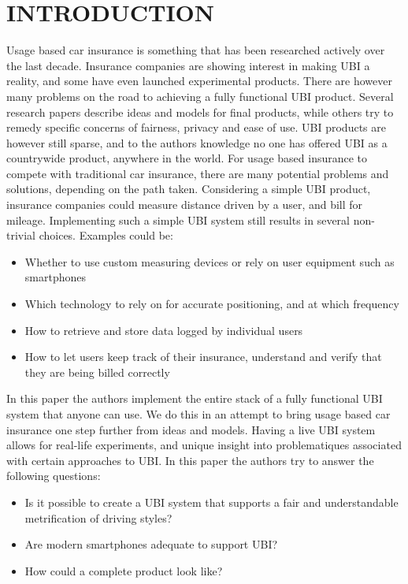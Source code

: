 \section{INTRODUCTION}\label{sec:intro}
Usage based car insurance is something that has been researched actively over the last decade. Insurance companies are showing interest in making UBI a reality, and some have even launched experimental products\citep{qbe_ubi}\citep{progressive_ubi}\citep{allstate_ubi}. There are however many problems on the road to achieving a fully functional UBI product. Several research papers describe ideas and models for final products, while others try to remedy specific concerns of fairness, privacy and ease of use. UBI products are however still sparse, and to the authors knowledge no one has offered UBI as a countrywide product, anywhere in the world.
For usage based insurance to compete with traditional car insurance, there are many potential problems and solutions, depending on the path taken. Considering a simple UBI product, insurance companies could measure distance driven by a user, and bill for mileage. Implementing such a simple UBI system still results in several non-trivial choices. Examples could be:

\begin{itemize}
\item Whether to use custom measuring devices or rely on user equipment such as smartphones
\item Which technology to rely on for accurate positioning, and at which frequency
\item How to retrieve and store data logged by individual users
\item How to let users keep track of their insurance, understand and verify that they are being billed correctly
\end{itemize}

In this paper the authors implement the entire stack of a fully functional UBI system that anyone can use. We do this in an attempt to bring usage based car insurance one step further from ideas and models. Having a live UBI system allows for real-life experiments, and unique insight into problematiques associated with certain approaches to UBI. In this paper the authors try to answer the following questions:

\begin{itemize}
\item Is it possible to create a UBI system that supports a fair and understandable metrification of driving styles?
\item Are modern smartphones adequate to support UBI?
\item How could a complete product look like?
\end{itemize}


